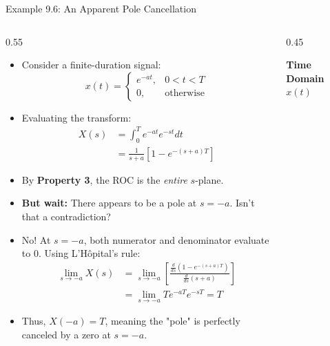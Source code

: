 \begin{frame}{Example 9.6: An Apparent Pole Cancellation}
    \begin{columns}[T]
        \begin{column}{0.55\textwidth}
            \begin{itemize}
                \item Consider a finite-duration signal:
                      \begin{equation*}
                          x(t) = \begin{cases} e^{-at}, & 0 < t < T \\ 0, & \text{otherwise} \end{cases}
                      \end{equation*}
                \item Evaluating the transform:
                      \begin{align*}
                          X(s) & = \int_{0}^{T} e^{-at} e^{-st} dt             \\
                               & = \frac{1}{s+a}\left[ 1 - e^{-(s+a)T} \right]
                      \end{align*}
                \item By \textbf{Property 3}, the ROC is the \textit{entire} $s$-plane.
                \item \textbf{But wait:} There appears to be a pole at $s = -a$. Isn't that a contradiction?
                \item No! At $s = -a$, both numerator and denominator evaluate to $0$. Using L'Hôpital's rule:
                      \begin{align*}
                          \lim_{s \to -a} X(s) & = \lim_{s \to -a} \left[ \frac{\frac{d}{ds}\left(1 - e^{-(s+a)T}\right)}{\frac{d}{ds}(s+a)} \right] \\
                                               & = \lim_{s \to -a} T e^{-aT}e^{-sT} = T
                      \end{align*}
                \item Thus, $X(-a) = T$, meaning the "pole" is perfectly canceled by a zero at $s = -a$.
            \end{itemize}
        \end{column}
        \begin{column}{0.45\textwidth}
            \begin{center}
                \vspace{-0.3cm}
                \textbf{Time Domain $x(t)$}\\
                \vspace{0.1cm}


\end{center}
\end{column}
\end{columns}
\end{frame}
